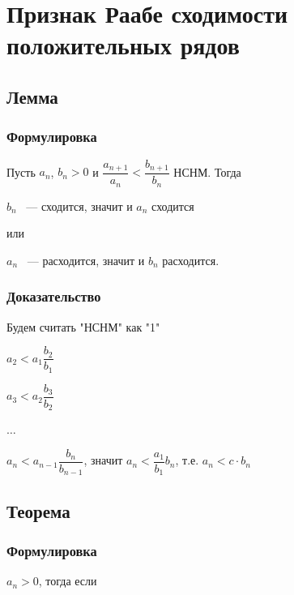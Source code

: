 \documentclass{article}
\begin{document}
    \newpage
    
    \section{Признак Раабе сходимости положительных рядов}
    
        \subsection{Лемма}
        
            \subsubsection{Формулировка}
            
                Пусть $a_n$, $b_n > 0$ и $\dfrac{a_{n + 1}}{a_n} < \dfrac{b_{n + 1}}{b_n}$ НСНМ. Тогда
                
                $b_n$ ~--- сходится, значит и $a_n$ сходится
                
                или
                
                $a_n$ ~--- расходится, значит и $b_n$ расходится.
                
            \subsubsection{Доказательство}
            
                Будем считать "НСНМ" как "1"
                
                $a_2 < a_1 \dfrac{b_2}{b_1}$
                
                $a_3 < a_2 \dfrac{b_3}{b_2}$
                
                $\ldots$
                
                $a_n < a_{n - 1} \dfrac{b_n}{b_{n - 1}}$, значит $a_n < \dfrac{a_1}{b_1} b_n$, т.е. $a_n < c \cdot b_n$
        
        \subsection{Теорема}
        
            \subsubsection{Формулировка}
            
                $a_n > 0$, тогда если 
                
\end{document}
